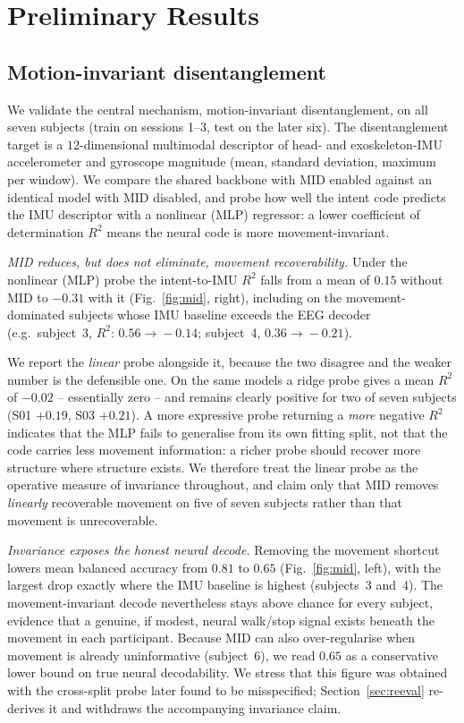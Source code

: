\documentclass[journal]{IEEEtran}
\begin{document}
\section{Preliminary Results}\label{sec:valid}
\subsection{Motion-invariant disentanglement}
We validate the central mechanism, motion-invariant disentanglement, on all seven
subjects (train on sessions 1--3, test on the later six). The disentanglement
target is a $12$-dimensional multimodal descriptor of head- and exoskeleton-IMU
accelerometer and gyroscope magnitude (mean, standard deviation, maximum per
window). We compare the shared backbone with MID enabled against an identical model
with MID disabled, and probe how well the intent code predicts the IMU descriptor
with a nonlinear (MLP) regressor: a lower coefficient of determination $R^2$ means
the neural code is more movement-invariant.

\emph{MID reduces, but does not eliminate, movement recoverability.} Under the
nonlinear (MLP) probe the intent-to-IMU $R^2$ falls from a mean of $0.15$ without MID
to $-0.31$ with it (Fig.~\ref{fig:mid}, right), including on the movement-dominated
subjects whose IMU baseline exceeds the EEG decoder (e.g.\ subject~3,
$R^2\!:\,0.56\!\rightarrow\!-0.14$; subject~4, $0.36\!\rightarrow\!-0.21$).

We report the \emph{linear} probe alongside it, because the two disagree and the
weaker number is the defensible one. On the same models a ridge probe gives a mean
$R^2$ of $-0.02$ -- essentially zero -- and remains clearly positive for two of seven
subjects (S01 $+0.19$, S03 $+0.21$). A more expressive probe returning a
\emph{more} negative $R^2$ indicates that the MLP fails to generalise from its own
fitting split, not that the code carries less movement information: a richer probe
should recover more structure where structure exists. We therefore treat the linear
probe as the operative measure of invariance throughout, and claim only that MID
removes \emph{linearly} recoverable movement on five of seven subjects rather than
that movement is unrecoverable.

\emph{Invariance exposes the honest neural decode.} Removing the movement shortcut
lowers mean balanced accuracy from $0.81$ to $0.65$ (Fig.~\ref{fig:mid}, left), with
the largest drop exactly where the IMU baseline is highest (subjects~3 and~4). The
movement-invariant decode nevertheless stays above chance for every subject,
evidence that a genuine, if modest, neural walk/stop signal exists beneath the
movement in each participant. Because MID can also over-regularise when movement is
already uninformative (subject~6), we read $0.65$ as a conservative lower bound on
true neural decodability. We stress that this figure was obtained with the
cross-split probe later found to be misspecified; Section~\ref{sec:reeval} re-derives
it and withdraws the accompanying invariance claim.
\end{document}
